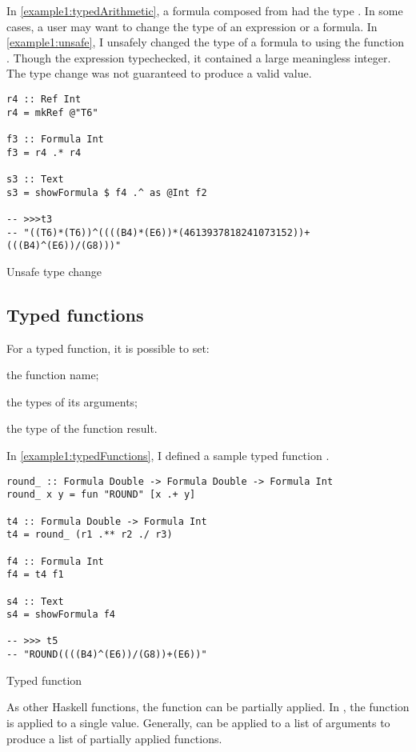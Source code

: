 \newpage

In \cref{example1:typedArithmetic}, a formula  composed from  had the type . In some cases, a user may want to change the type of an expression or a formula. In \cref{example1:unsafe}, I unsafely changed the type of a formula  to  using the function . Though the expression typechecked, it contained a large meaningless integer. The type change was not guaranteed to produce a valid value.

\begin{listing}[!h]
  \begin{verbatim}
r4 :: Ref Int
r4 = mkRef @"T6"

f3 :: Formula Int
f3 = r4 .* r4

s3 :: Text
s3 = showFormula $ f4 .^ as @Int f2

-- >>>t3
-- "((T6)*(T6))^((((B4)*(E6))*(4613937818241073152))+(((B4)^(E6))/(G8)))"    
\end{verbatim}
  \caption{Unsafe type change}
  \label{example1:unsafe}
\end{listing}

\subsection{Typed functions}

For a typed function, it is possible to set:
\begin{inlinelist}
  \item the function name;
  \item the types of its arguments;
  \item the type of the function result.
\end{inlinelist}

In \cref{example1:typedFunctions}, I defined a sample typed function .

\begin{listing}[!h]
  \begin{verbatim}
round_ :: Formula Double -> Formula Double -> Formula Int
round_ x y = fun "ROUND" [x .+ y]

t4 :: Formula Double -> Formula Int
t4 = round_ (r1 .** r2 ./ r3)

f4 :: Formula Int
f4 = t4 f1

s4 :: Text
s4 = showFormula f4

-- >>> t5
-- "ROUND((((B4)^(E6))/(G8))+(E6))"
\end{verbatim}
  \caption{Typed function}
  \label{example1:typedFunctions}
\end{listing}

As other Haskell functions, the  function can be partially applied.
In , the  function is applied to a single value.
Generally,  can be applied to a list of arguments to produce a list of partially applied functions.